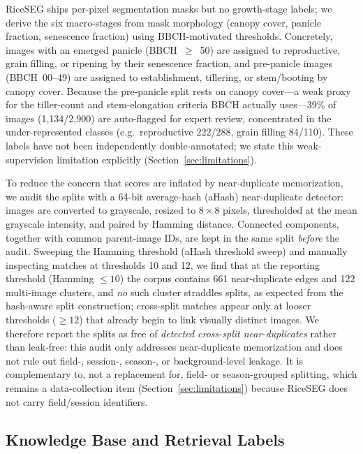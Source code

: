 \documentclass[conference]{IEEEtran}
\begin{document}
RiceSEG ships per-pixel segmentation masks but no growth-stage labels; we derive the six macro-stages from mask morphology (canopy cover, panicle fraction, senescence fraction) using BBCH-motivated thresholds. Concretely, images with an emerged panicle (BBCH~$\ge$~50) are assigned to reproductive, grain filling, or ripening by their senescence fraction, and pre-panicle images (BBCH~00--49) are assigned to establishment, tillering, or stem/booting by canopy cover. Because the pre-panicle split rests on canopy cover---a weak proxy for the tiller-count and stem-elongation criteria BBCH actually uses---39\% of images (1{,}134/2{,}900) are auto-flagged for expert review, concentrated in the under-represented classes (e.g.\ reproductive 222/288, grain filling 84/110). These labels have not been independently double-annotated; we state this weak-supervision limitation explicitly (Section~\ref{sec:limitations}).

To reduce the concern that scores are inflated by near-duplicate memorization, we audit the splits with a 64-bit average-hash (aHash) near-duplicate detector: images are converted to grayscale, resized to $8\times8$ pixels, thresholded at the mean grayscale intensity, and paired by Hamming distance. Connected components, together with common parent-image IDs, are kept in the same split \emph{before} the audit. Sweeping the Hamming threshold (aHash threshold sweep) and manually inspecting matches at thresholds 10 and 12, we find that at the reporting threshold (Hamming $\le 10$) the corpus contains 661 near-duplicate edges and 122 multi-image clusters, and \emph{no} such cluster straddles splits, as expected from the hash-aware split construction; cross-split matches appear only at looser thresholds ($\ge 12$) that already begin to link visually distinct images. We therefore report the splits as free of \emph{detected cross-split near-duplicates} rather than leak-free: this audit only addresses near-duplicate memorization and does not rule out field-, session-, season-, or background-level leakage. It is complementary to, not a replacement for, field- or season-grouped splitting, which remains a data-collection item (Section~\ref{sec:limitations}) because RiceSEG does not carry field/session identifiers.




\subsection{Knowledge Base and Retrieval Labels}
\end{document}
